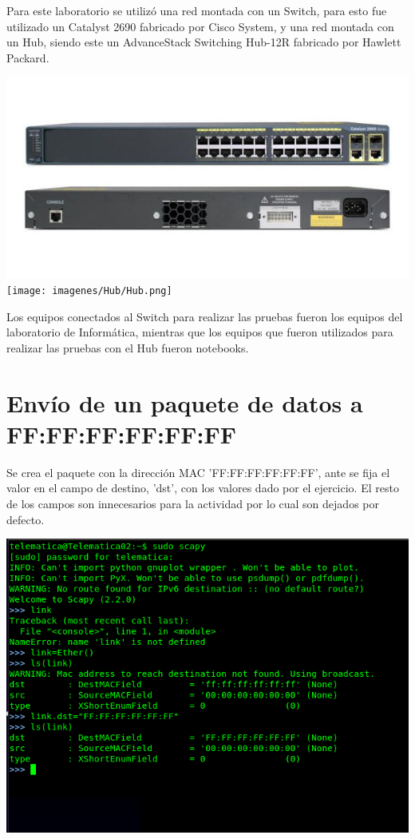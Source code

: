 \documentclass[spanish]{udpreport}
\begin{document}
Para este laboratorio se utilizó una red montada con un Switch, para esto fue utilizado un Catalyst 2690 fabricado por Cisco System, y una red montada con un Hub, siendo este un AdvanceStack Switching Hub-12R fabricado por Hawlett Packard.

\begin{center}
	\includegraphics[scale=.5]{imagenes/Switch/switch.png}
	\texttt{[image: imagenes/Hub/Hub.png]}
	\linebreak
\end{center}

Los equipos conectados al Switch para realizar las pruebas fueron los equipos del laboratorio de Informática, mientras que los equipos que fueron utilizados para realizar las pruebas con el Hub fueron notebooks.

\newpage


\section{Envío de un paquete de datos a FF:FF:FF:FF:FF:FF}

Se crea el paquete con la dirección MAC 'FF:FF:FF:FF:FF:FF', ante se fija el valor en el campo de destino, 'dst', con los valores dado por el ejercicio. El resto de los campos son innecesarios para la actividad por lo cual son dejados por defecto.

\begin{center}
	\includegraphics[scale=.37]{imagenes/Switch/Test_1a_b.png}
\end{center}
\end{document}

